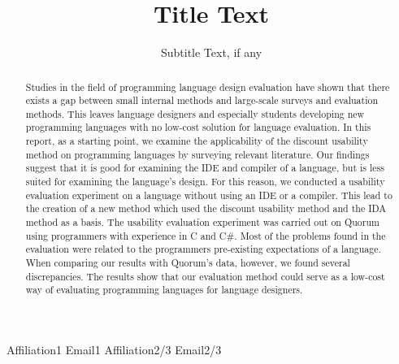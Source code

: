 \documentclass[preprint,10pt]{sigplanconf}
\begin{document}
\setlength{\pdfpageheight}{\paperheight}
\setlength{\pdfpagewidth}{\paperwidth}




\title{Title Text}
\subtitle{Subtitle Text, if any}

           {Affiliation1}
           {Email1}
           {Affiliation2/3}
           {Email2/3}

\maketitle

\begin{abstract}
Studies in the field of programming language design evaluation have shown that there exists a gap between small internal methods and large-scale surveys and evaluation methods. This leaves language designers and especially students developing new programming languages with no low-cost solution for language evaluation. In this report, as a starting point, we examine the applicability of the discount usability method on programming languages by surveying relevant literature. Our findings suggest that it is good for examining the IDE and compiler of a language, but is less suited for examining the language’s design. For this reason, we conducted a usability evaluation experiment on a language without using an IDE or a compiler. This lead to the creation of a new method which used the discount usability method and the IDA method as a basis. The usability evaluation experiment was carried out on Quorum using programmers with experience in C and C\#. Most of the problems found in the evaluation were related to the programmers pre-existing expectations of a language. When comparing our results with Quorum’s data, however, we found several discrepancies.  The results show that our evaluation method could serve as a low-cost way of evaluating programming languages for language designers. 
\end{abstract}
\end{document}
